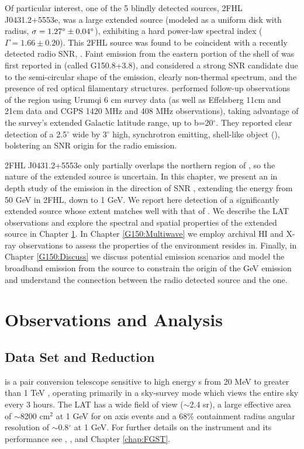 Of particular interest, one of the 5 blindly detected sources, 2FHL J0431.2+5553e, was a large extended source  (modeled as a uniform disk with radius, ${\rm \sigma = 1.27^\circ \pm 0.04^\circ}$), exhibiting a hard power-law spectral index ($\Gamma = 1.66 \pm 0.20$). This 2FHL source was found to be coincident with a recently detected radio SNR, \Gone{}. Faint emission from the eastern portion of the shell of \Gone{} was first reported in \cite{Gerbrandt14} (called G150.8+3.8), and considered a strong SNR candidate due to the semi-circular shape of the emission, clearly non-thermal spectrum, and the presence of red optical filamentary structures. \cite{Gao14} performed follow-up observations of the region using Urumqi 6 cm survey data (as well as Effelsberg 11cm and 21cm data and CGPS 1420 MHz and 408 MHz observations), taking advantage of the survey's extended Galactic latitude range, up to b=20$^\circ$. They reported clear detection of a 2.5$^\circ$ wide by 3$^\circ$ high, synchrotron emitting, shell-like object (\Gone{}),  bolstering an SNR origin for the radio emission.

2FHL J0431.2+5553e only partially overlaps the northern region of \Gone{}, so the nature of the extended source is uncertain. In this chapter, we present an in depth study of the \gam{} emission in the direction of SNR \Gone{}, extending the energy from 50 GeV in 2FHL, down to 1 GeV.  We report here  detection of  a significantly extended source whose extent matches well with that of \Gone{}. We describe the LAT observations and explore the spectral and spatial properties of the extended \gam{} source in Chapter \ref{G150:LATobs}. In Chapter \ref{G150:Multiwave} we employ archival HI and X-ray observations to assess the properties of the environment \Gone{} resides in. Finally, in Chapter \ref{G150:Discuss} we discuss potential \gam{} emission scenarios and model the broadband emission from the source to constrain the origin of the GeV emission and understand the connection between the radio detected source \Gone{} and the \gam{} one.

%
%
\section{\FermiLat{}  Observations and  Analysis }\label{G150:LATobs}
\subsection{Data Set and Reduction}\label{G150:LATdata}
\FermiLat{} is a pair conversion telescope sensitive to high energy \gam{}s  from 20 MeV to greater than 1 TeV \citep{2FHL}, operating primarily in a sky-survey mode which views  the entire sky every 3 hours. The LAT has a wide field of view ($\sim$2.4 sr), a large effective area of $\sim$8200 cm$^2$ at  1 GeV for on axis events and a  68\% containment radius angular resolution  of $\sim$0.8$^\circ$  at 1 GeV. For further details  on the instrument and its performance see \cite{atwood09}, \cite{lat_perf}, and Chapter \ref{chap:FGST}.

